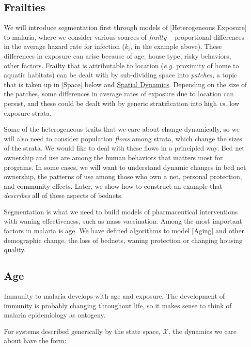\documentclass[
]{book}
\begin{document}
\subsection{Frailties}\label{frailties}

We will introduce segmentation first through models of {[}Heterogeneous Exposure{]} to malaria, where we consider various sources of \emph{frailty} -- proportional differences in the average hazard rate for infection (\(k_i\), in the example above). These differences in exposure can arise because of age, house type, risky behaviors, other factors. Frailty that is attributable to location (\emph{e.g.} proximity of home to aquatic habitats) can be dealt with by sub-dividing space into \emph{patches,} a topic that is taken up in {[}Space{]} below and \hyperref[spatial-dynamics]{Spatial Dynamics}. Depending on the size of the patches, some differences in average rates of exposure due to location can persist, and these could be dealt with by generic stratification into high \emph{vs.} low exposure strata.

Some of the heterogeneous traits that we care about change dynamically, so we will also need to consider population \emph{flows} among strata, which change the sizes of the strata. We would like to deal with these flows in a principled way. Bed net ownership and use are among the human behaviors that matters most for programs. In some cases, we will want to understand dynamic changes in bed net ownership, the patterns of use among those who own a net, personal protection, and community effects. Later, we show how to construct an example that \emph{describes} all of these aspects of bednets.

Segmentation is what we need to build models of pharmaceutical interventions with waning effectiveness, such as mass vaccination. Among the most important factors in malaria is age. We have defined algorithms to model {[}Aging{]} and other demographic change, the loss of bednets, waning protection or changing housing quality.

\subsection{Age}\label{age}

Immunity to malaria develops with age and exposure. The development of immunity is probably changing throughout life, so it makes sense to think of malaria epidemiology as ontogeny.

For systems described generically by the state space, \(\mathscr X\), the dynamics we care about have the form:
\end{document}
